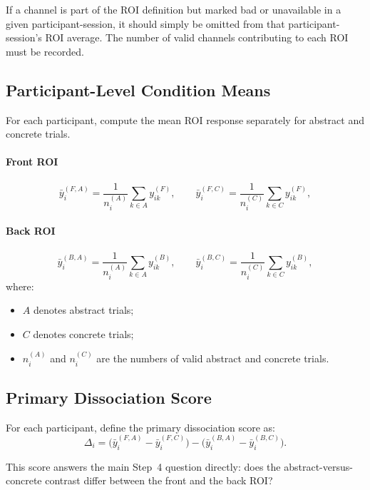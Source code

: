 \documentclass[11pt]{article}
\begin{document}
If a channel is part of the ROI definition but marked bad or unavailable in a given participant-session,
it should simply be omitted from that participant-session's ROI average.
The number of valid channels contributing to each ROI must be recorded.

\subsection{Participant-Level Condition Means}
For each participant, compute the mean ROI response separately for abstract and concrete trials.

\paragraph{Front ROI}
\begin{equation}
\bar{y}^{(F,A)}_i
=
\frac{1}{n_i^{(A)}}
\sum_{k \in A} y^{(F)}_{ik},
\qquad
\bar{y}^{(F,C)}_i
=
\frac{1}{n_i^{(C)}}
\sum_{k \in C} y^{(F)}_{ik},
\end{equation}

\paragraph{Back ROI}
\begin{equation}
\bar{y}^{(B,A)}_i
=
\frac{1}{n_i^{(A)}}
\sum_{k \in A} y^{(B)}_{ik},
\qquad
\bar{y}^{(B,C)}_i
=
\frac{1}{n_i^{(C)}}
\sum_{k \in C} y^{(B)}_{ik},
\end{equation}
where:
\begin{itemize}
    \item \(A\) denotes abstract trials;
    \item \(C\) denotes concrete trials;
    \item \(n_i^{(A)}\) and \(n_i^{(C)}\) are the numbers of valid abstract and concrete trials.
\end{itemize}

\subsection{Primary Dissociation Score}
For each participant, define the primary dissociation score as:
\begin{equation}
\Delta_i
=
\bigl(\bar{y}^{(F,A)}_i - \bar{y}^{(F,C)}_i\bigr)
-
\bigl(\bar{y}^{(B,A)}_i - \bar{y}^{(B,C)}_i\bigr).
\end{equation}

This score answers the main Step~4 question directly:
does the abstract-versus-concrete contrast differ between the front and the back ROI?
\end{document}
